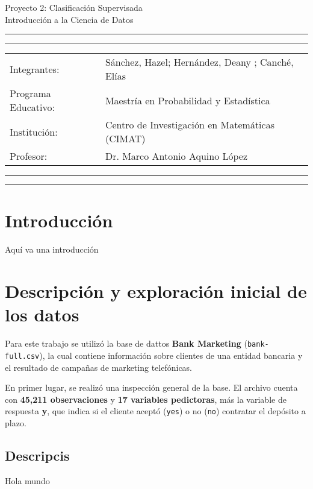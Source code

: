 \documentclass[10pt]{article}
\newcommand{\studentname}{Sánchez, Hazel; Hernández, Deany ; Canché, Elías}
\newcommand{\researchcentre}{Maestría en Probabilidad y Estadística}
\newcommand{\institution}{Centro de Investigación en Matemáticas (CIMAT)}
\newcommand{\supervisor}{Dr. Marco Antonio Aquino López}
\begin{document}
\begin{center}
{\Large{Proyecto 2: Clasificación Supervisada}} \\
\vspace{2mm}
{\Large{Introducción a la Ciencia de Datos}} \\
\end{center}

\vspace{5mm}
\hrule
\vspace{1mm}
\hrule

\vspace{3mm}
\begin{tabular}{ll} 
Integrantes:           	        & {\studentname}   \\ 
Programa Educativo: 	        & {\researchcentre}  \\ 
Institución:                 & {\institution}  \\
Profesor: 	                 & {\supervisor}  \\ 
\end{tabular}

\vspace{3mm}
\hrule
\vspace{1mm}
\hrule

\begin{abstract}
\lipsum[1]
\end{abstract}

\section{Introducción}
Aquí va una introducción


\section{Descripción y exploración inicial de los datos}\label{sec:dataset}
Para este trabajo se utilizó la base de dattos \textbf{Bank Marketing} (\texttt{bank-full.csv}), la cual contiene información sobre clientes de una entidad bancaria y el resultado de campañas de marketing telefónicas. 

En primer lugar, se realizó una inspección general de la base. El archivo cuenta con \textbf{45,211 observaciones} y \textbf{17 variables pedictoras}, más la variable de respuesta \textbf{y}, que indica si el cliente aceptó (\texttt{yes}) o no (\texttt{no}) contratar el depósito a plazo.   


\subsection{Descripcis}
Hola mundo
\end{document}
